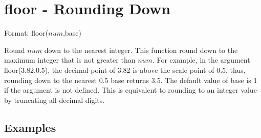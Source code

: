 
%

\section{floor - Rounding Down\label{sect:floor}}

Format: floor($num$,base)

Round $num$ down to the nearest integer.  This function round down to the maximum integer that is not greater than $num$. For example, in the argument floor(3.82,0.5), the decimal point of 3.82 is above the scale point of 0.5, thus, rounding down to the nearest 0.5 base returns 3.5. The default value of base is 1 if the argument is not defined. This is equivalent to rounding to an integer value by truncating all decimal digits. 


\subsection*{Examples}


%
